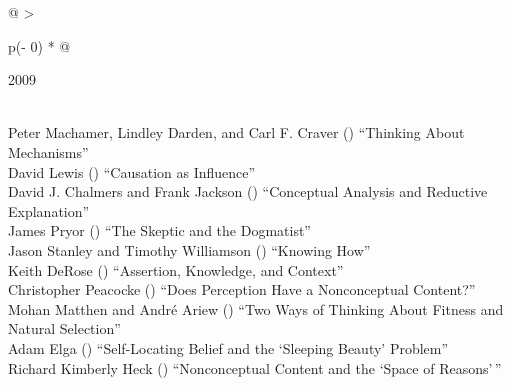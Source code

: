 \documentclass[
  10pt,
  letterpaper,
  DIV=11,
  numbers=noendperiod,
  twoside]{scrartcl}
\begin{document}
\begin{longtable}[]{@{}
  >{\raggedright\arraybackslash}p{(\columnwidth - 0\tabcolsep) * }@{}}

\caption{\label{tbl-top-ten-2000}Most cited articles published less than
ten years ago as of 2009.}

\tabularnewline

\toprule\noalign{}
\begin{minipage}[b]{\linewidth}\raggedright
2009
\end{minipage} \\
\midrule\noalign{}
\endhead
\bottomrule\noalign{}
\endlastfoot
Peter Machamer, Lindley Darden, and Carl F. Craver
()
``Thinking About Mechanisms'' \\
David Lewis
()
``Causation as Influence'' \\
David J. Chalmers and Frank Jackson
()
``Conceptual Analysis and Reductive Explanation'' \\
James Pryor
()
``The Skeptic and the Dogmatist'' \\
Jason Stanley and Timothy Williamson
()
``Knowing How'' \\
Keith DeRose
()
``Assertion, Knowledge, and Context'' \\
Christopher Peacocke
()
``Does Perception Have a Nonconceptual Content?'' \\
Mohan Matthen and André Ariew
()
``Two Ways of Thinking About Fitness and Natural Selection'' \\
Adam Elga
()
``Self-Locating Belief and the `Sleeping Beauty' Problem'' \\
Richard Kimberly Heck
()
``Nonconceptual Content and the `Space of Reasons'\,'' \\

\end{longtable}
\end{document}
